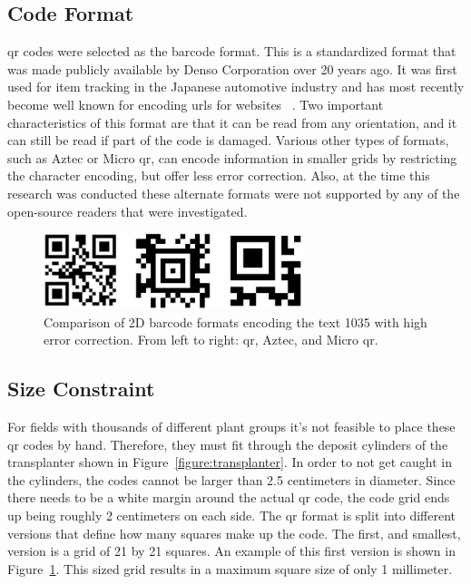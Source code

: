 \subsection{Code Format}
\label{section:code_format}

\acf{qr} codes were selected as the barcode format. This is a standardized format that was made publicly available by Denso Corporation over 20 years ago.  It was first used for item tracking in the Japanese automotive industry and has most recently become well known for encoding \acp{url} for websites ~\citep{Denso:2014}. Two important characteristics of this format are that it can be read from any orientation, and it can still be read if part of the code is damaged.  Various other types of formats, such as Aztec or Micro \ac{qr}, can encode information in smaller grids by restricting the character encoding, but offer less error correction.  Also, at the time this research was conducted these alternate formats were not supported by any of the open-source readers that were investigated. 

\begin{figure}
	\centering
    \includegraphics[width=3in]{figures/generated_codes_1035.jpg}
    \caption[2D barcode formats]{Comparison of 2D barcode formats encoding the text 1035 with high error correction.  From left to right: \acf{qr}, Aztec, and Micro \ac{qr}.}
    \label{barcode_formats}
\end{figure} 

\subsection{Size Constraint}

For fields with thousands of different plant groups it's not feasible to place these \ac{qr} codes by hand.  Therefore, they must fit through the deposit cylinders of the transplanter shown in Figure~\ref{figure:transplanter}.  In order to not get caught in the cylinders, the codes cannot be larger than 2.5 centimeters in diameter. Since there needs to be a white margin around the actual \ac{qr} code, the code grid ends up being roughly 2 centimeters on each side.  The \ac{qr} format is split into different versions that define how many squares make up the code.  The first, and smallest, version is a grid of 21 by 21 squares.  An example of this first version is shown in Figure~\ref{barcode_formats}.  This sized grid results in a maximum square size of only 1 millimeter.  

